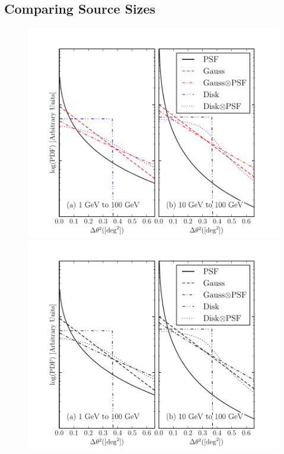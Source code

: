 \subsection{Comparing Source Sizes}


\begin{figure}[htbp]
    \ifcolorfigure
      \includegraphics{chapters/extended_analysis/figures/mc_plots/compare_disk_gauss_color.pdf}
    \else
      \includegraphics{chapters/extended_analysis/figures/mc_plots/compare_disk_gauss_bw.pdf}

\end{figure}
